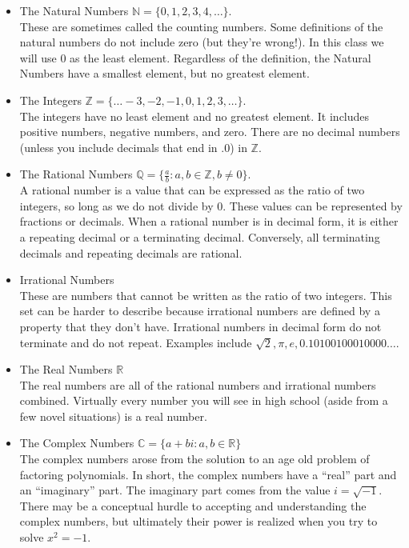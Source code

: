 \documentclass[12pt,fleqn]{book}
\begin{document}
\begin{itemize}
    \item
          The Natural Numbers $\mathbb N = \{0, 1, 2, 3, 4, \ldots \}$.
          \\
          These are sometimes called the counting numbers.  Some definitions of the natural numbers do not include zero (but they're wrong!).  In this class we will use 0 as the least element.  Regardless of the definition, the Natural Numbers have a smallest element, but no greatest element.
    \item
          The Integers $\mathbb Z = \{ \ldots -3, -2, -1, 0, 1, 2, 3, \ldots \}$.
          \\
          The integers have no least element and no greatest element.  It includes positive numbers, negative numbers, and zero.  There are no decimal numbers (unless you include decimals that end in .0) in $\mathbb Z$.
    \item
          The Rational Numbers $\mathbb Q = \{\frac ab : a,b\in\mathbb Z, b\ne 0 \}$.
          \\
          A rational number is a value that can be expressed as the ratio of two integers, so long as we do not divide by 0.  These values can be represented by fractions or decimals.  When a rational number is in decimal form, it is either a repeating decimal or a terminating decimal.  Conversely, all terminating decimals and repeating decimals are rational.
    \item
          Irrational Numbers
          \\
          These are numbers that cannot be written as the ratio of two integers.  This set can be harder to describe because irrational numbers are defined by a property that they don't have.  Irrational numbers in decimal form do not terminate and do not repeat.  Examples include $\sqrt 2, \pi, e, 0.10100100010000\ldots$.
    \item
          The Real Numbers $\mathbb R$
          \\
          The real numbers are all of the rational numbers and irrational numbers combined.  Virtually every number you will see in high school (aside from a few novel situations) is a real number.
    \item The Complex Numbers $\mathbb C = \{a+bi : a,b\in \mathbb R\}$
          \\
          The complex numbers arose from the solution to an age old problem of factoring polynomials.  In short, the complex numbers have a ``real'' part and an ``imaginary'' part.  The imaginary part comes from the value $i = \sqrt{-1}$.  There may be a conceptual hurdle to accepting and understanding the complex numbers, but ultimately their power is realized when you try to solve $x^2=-1$.
\end{itemize}
\end{document}
